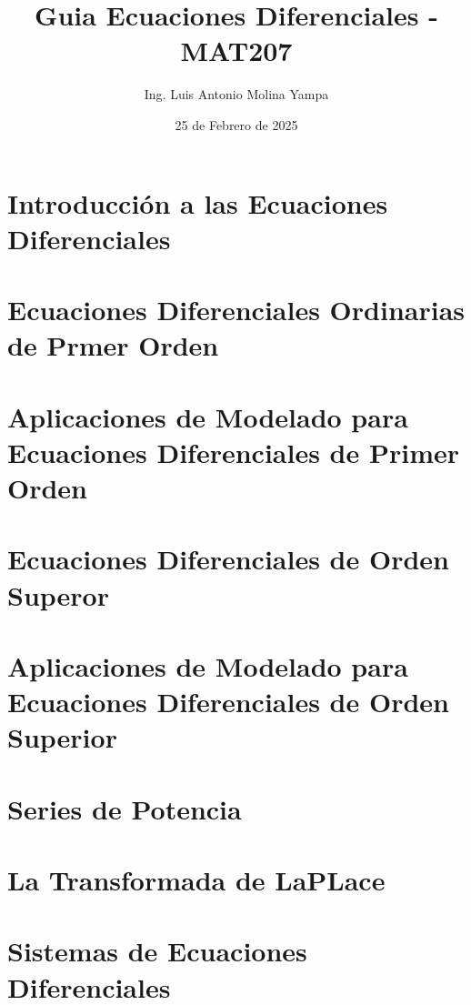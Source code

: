 \documentclass[a4paper,12pt,openany]{book} %
\begin{document}
\title{Guia Ecuaciones Diferenciales - MAT207}
\author{Ing. Luis Antonio Molina Yampa}
\date{25 de Febrero de 2025}
\maketitle  %

\newpage  %

\tableofcontents
\cleardoublepage %
\newpage  %

\chapter{Introducción a las Ecuaciones Diferenciales}
\clearpage
\thispagestyle{plain}
\newpage

\chapter{Ecuaciones Diferenciales Ordinarias de Prmer Orden}
\clearpage
\thispagestyle{plain}
\newpage

\chapter{Aplicaciones de Modelado para Ecuaciones Diferenciales de Primer Orden}
\clearpage
\thispagestyle{plain}
\newpage

\chapter{Ecuaciones Diferenciales de Orden Superor}
\clearpage
\thispagestyle{plain}
\newpage

\chapter{Aplicaciones de Modelado para Ecuaciones Diferenciales de Orden Superior}
\clearpage
\thispagestyle{plain}
\newpage

\chapter{Series de Potencia}
\clearpage
\thispagestyle{plain}
\newpage

\chapter{La Transformada de LaPLace}
\clearpage
\thispagestyle{plain}
\newpage

\chapter{Sistemas de Ecuaciones Diferenciales}
\clearpage
\thispagestyle{plain}
\end{document}
